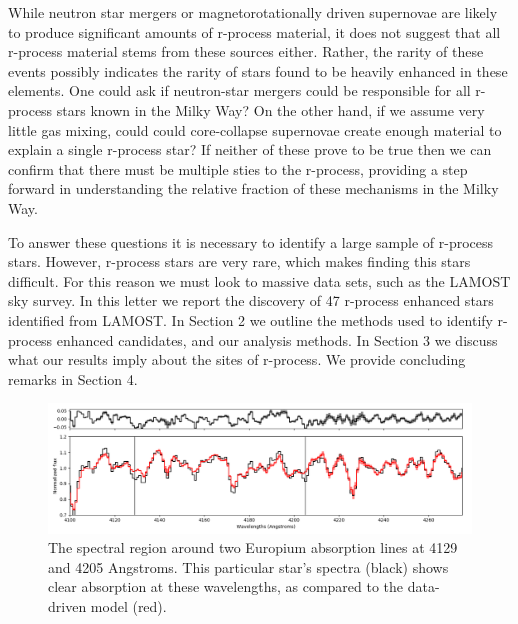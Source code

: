 \documentclass[a4paper,fleqn,usenatbib]{mnras}
\begin{document}
	While neutron star mergers or magnetorotationally driven supernovae are likely to produce significant amounts of r-process material, it does not suggest that all r-process material stems from these sources either. Rather, the rarity of these events possibly indicates the rarity of stars found to be heavily enhanced in these elements. One could ask if neutron-star mergers could be responsible for all r-process stars known in the Milky Way? On the other hand, if we assume very little gas mixing, could could core-collapse supernovae create enough material to explain a single r-process star? If neither of these prove to be true then we can confirm that there must be multiple sties to the r-process, providing a step forward in understanding the relative fraction of these mechanisms in the Milky Way.
	
	
	To answer these questions it is necessary to identify a large sample of r-process stars.
	 However, r-process stars are very rare, which makes finding this stars difficult. For this reason we must look to massive data sets, such as the LAMOST sky survey. In this letter we report the  discovery of 47 r-process enhanced stars identified from LAMOST.
	In Section 2 we outline the methods used to identify r-process enhanced candidates, and our analysis methods. In Section 3 we discuss what our results imply about the sites of r-process. We provide concluding remarks in Section 4.
	
	
	\begin{figure}
		\includegraphics[width=\columnwidth]{423451}
		\caption{The spectral region around two Europium absorption lines at 4129 and 4205 Angstroms. This particular star's spectra (black) shows clear absorption at these wavelengths, as compared to the data-driven model (red).}
		\label{fig:starindex_423451}
	\end{figure}
	
\end{document}
